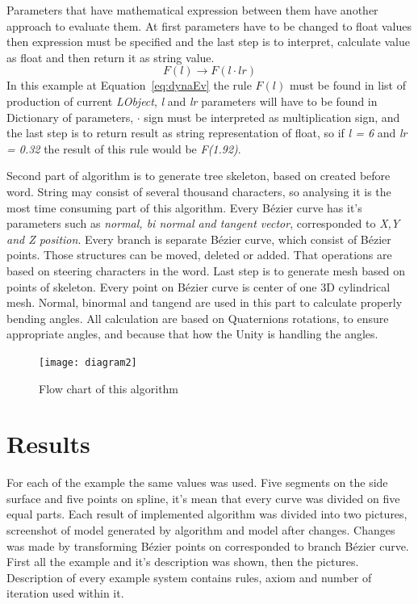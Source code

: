 \documentclass[b5paper,twoside,11pt]{article}
\begin{document}
\newpage
Parameters that have mathematical expression between them have another approach to evaluate them. At first parameters have to be changed to float values then expression must be specified and the last step is to interpret, calculate value as float and then return it as string value.
  \begin{equation}\label{eq:dynaEv}
  F(l) \rightarrow F(l \cdot lr)
  \end{equation}
  In this example at Equation~\ref{eq:dynaEv} the rule $F(l)$ must be found in list of production of current \textit{LObject}, \textit{l} and \textit{lr} parameters will have to be found in Dictionary of parameters, $ \cdot$ sign must be interpreted as multiplication sign, and the last step is to return result as string representation of float, so if \textit{l = 6} and \textit{lr = 0.32} the result of this rule would be \textit{F(1.92)}.\par
Second part of algorithm is to generate tree skeleton, based on created before word. String may consist of several thousand characters, so analysing it is the most time consuming part of this algorithm.
Every Bézier curve has it's parameters such as \textit{normal, bi normal and tangent vector}, corresponded to \textit{X,Y and Z position}. Every branch is separate Bézier curve, which consist of Bézier points. Those structures can be moved, deleted or added. That operations are based on steering characters in the word.	
Last step is to generate  mesh based on points of skeleton. Every point on Bézier curve is center of one 3D cylindrical mesh. Normal, binormal and tangend are used in this part to calculate properly bending angles.
All calculation are based on Quaternions rotations, to ensure appropriate angles, and because that how the Unity is handling the angles.
\begin{figure}[!htp]
\centering
  \texttt{[image: diagram2]}
\caption{Flow chart of this algorithm \label{diagram}}
\end{figure}



\section{Results}
For each of the example the same values was used. Five segments on the side surface and five points on spline, it's mean that every curve was divided on five equal parts. Each result of implemented algorithm was divided into two pictures, screenshot of model generated by algorithm and model after changes. Changes was made by transforming Bézier points on corresponded to branch Bézier curve. First all the example and it's description was shown, then the pictures. Description of every example system contains rules, axiom and number of iteration used within it.
\end{document}
